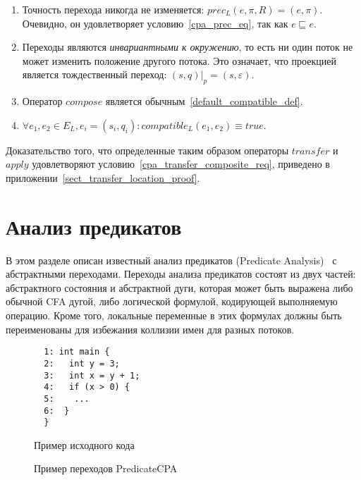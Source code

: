 \begin{enumerate}
\item Точность перехода никогда не изменяется: $prec_L(e, \pi, R) = (e, \pi)$.
Очевидно, он удовлетворяет условию~\ref{cpa_prec_eq}, так как $e \sqsubseteq e$.

\item Переходы являются {\em инвариантными к окружению}, то есть ни один поток не может изменить положение другого потока.
Это означает, что проекцией является тождественный переход:
$(s, q)|_p = (s, \varepsilon)$.

\item Оператор $compose$ является обычным~\ref{default_compatible_def}.

\item $\forall e_1, e_2 \in E_L, e_i = (s_i, q_i):compatible_L(e_1,e_2) \equiv true$.

\end{enumerate}

Доказательство того, что определенные таким образом операторы $transfer$ и $apply$ удовлетворяют условию~\ref{cpa_transfer_composite_req}, приведено в приложении~\ref{sect_transfer_location_proof}. 



\section{Анализ предикатов}
\label{sect_predicate_analysis}

В этом разделе описан известный анализ предикатов (Predicate Analysis)~\cite{Beyer10} с абстрактными переходами.
Переходы анализа предикатов состоят из двух частей: абстрактного состояния и абстрактной дуги, которая может быть выражена либо обычной CFA дугой, либо логической формулой, кодирующей выполняемую операцию.
Кроме того, локальные переменные в этих формулах должны быть переименованы для избежания коллизии имен для разных потоков.

\begin{figure}[h]
\begin{minipage}[h]{0.3\textwidth}
\begin{verbatim}
  1: int main {
  2:   int y = 3;
  3:   int x = y + 1;
  4:   if (x > 0) {
  5:    ...
  6:  }
  }
\end{verbatim}
\caption{Пример исходного кода}
\label{PredicateCodeExample}
\end{minipage}
\hfill
\begin{minipage}{0.65\textwidth}
    \caption{Пример переходов PredicateCPA}
    \label{img:PredicateCPA}
\end{minipage}
\end{figure}

